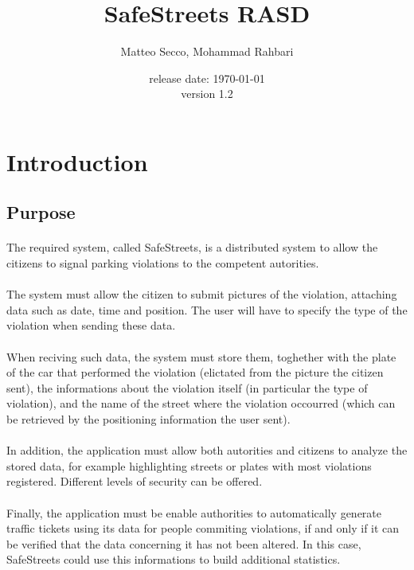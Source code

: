 \documentclass{article}
\title{SafeStreets RASD}
\date{release date: \today\\version 1.2}
\author{Matteo Secco, Mohammad Rahbari}
\begin{document}
\maketitle
\newpage
\tableofcontents
\pagebreak
{}


\section{Introduction}

	\subsection{Purpose}
	
		\paragraph{}The required system, called SafeStreets, is a distributed system to allow the citizens to signal parking violations to the competent autorities.
		\paragraph{}The system must allow the citizen to submit pictures of the violation, attaching data such as date, time and position. The user will have to specify the type of the violation when sending these data. 
		\paragraph{}When reciving such data, the system must store them, toghether with the plate of the car that performed the violation (elictated from the picture the citizen sent), the informations about the violation itself (in particular the type of violation), and the name of the street where the violation occourred (which can be retrieved by the positioning information the user sent).
		\paragraph{}In addition, the application must allow both autorities and citizens to analyze the stored data, for example highlighting streets or plates with most violations registered. Different levels of security can be offered.
		\paragraph{}Finally, the application must be enable authorities to automatically generate traffic tickets using its data for people commiting violations, if and only if it can be verified that the data concerning it has not been altered. In this case, SafeStreets could use this informations to build additional statistics.
\end{document}
